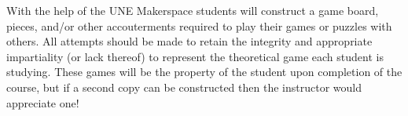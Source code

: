 With the help of the UNE Makerspace students will construct a game board, pieces, and/or other accouterments required to play their games or puzzles with others. All attempts should be made to retain the integrity and appropriate impartiality (or lack thereof) to represent the theoretical game each student is studying. These games will be the property of the student upon completion of the course, but if a second copy can be constructed then the instructor would appreciate one!